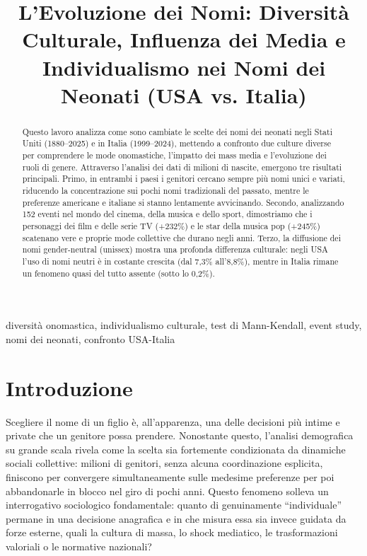 \documentclass[conference]{IEEEtran}
\begin{document}
\title{L'Evoluzione dei Nomi: Diversità Culturale, Influenza dei Media e Individualismo nei Nomi dei Neonati (USA vs. Italia)}

\author{
\and
{}
}

\maketitle

\begin{abstract}
Questo lavoro analizza come sono cambiate le scelte dei nomi dei neonati negli Stati Uniti (1880--2025)
 e in Italia (1999--2024), mettendo a confronto due culture diverse per comprendere le mode onomastiche,
 l'impatto dei mass media e l'evoluzione dei ruoli di genere. Attraverso l'analisi dei dati di milioni
 di nascite, emergono tre risultati principali. Primo, in entrambi i paesi i genitori cercano sempre più 
 nomi unici e variati, riducendo la concentrazione sui pochi nomi tradizionali del passato, mentre le 
 preferenze americane e italiane si stanno lentamente avvicinando. Secondo, analizzando 152 eventi nel 
 mondo del cinema, della musica e dello sport, dimostriamo che i personaggi dei film e delle serie TV 
 (+232\%) e le star della musica pop (+245\%) scatenano vere e proprie mode collettive che durano negli 
 anni. 
 Terzo, la diffusione dei nomi gender-neutral (unissex) mostra una profonda differenza culturale: 
 negli USA l'uso di nomi neutri è in costante crescita (dal 7,3\% all'8,8\%), mentre in Italia rimane 
 un fenomeno quasi del tutto assente (sotto lo 0,2\%).
\end{abstract}

\begin{IEEEkeywords}
diversità onomastica, individualismo culturale, test di Mann-Kendall, event study, nomi dei neonati, confronto USA-Italia
\end{IEEEkeywords}

\section{Introduzione}

Scegliere il nome di un figlio è, all'apparenza, una delle decisioni più intime e private che un genitore 
possa prendere. Nonostante questo, l'analisi demografica su grande scala rivela come la scelta sia fortemente 
condizionata da dinamiche sociali collettive: milioni di genitori, senza alcuna coordinazione esplicita, 
finiscono per convergere simultaneamente sulle medesime preferenze per poi abbandonarle in blocco nel 
giro di pochi anni. 
Questo fenomeno solleva un interrogativo sociologico fondamentale: quanto di genuinamente ``individuale'' 
permane in una decisione anagrafica e in che misura essa sia invece guidata da forze esterne, 
quali la cultura di massa, lo shock mediatico, le trasformazioni valoriali o le normative nazionali?
\end{document}
